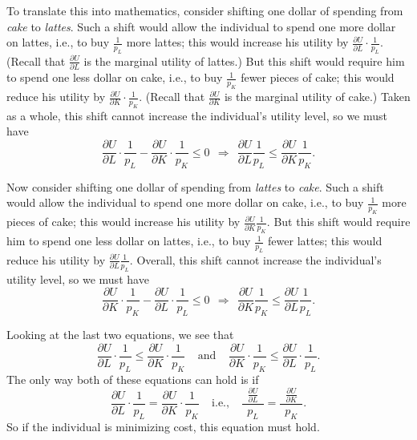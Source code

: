To translate this into mathematics, consider shifting one dollar of spending from \emph{cake} to \emph{lattes}. Such a shift would allow the individual to spend one more dollar on lattes, i.e., to buy $\displaystyle\frac{1}{p_L}$ more lattes; this would increase his utility by $\displaystyle\frac{\partial U}{\partial L}\cdot\frac{1}{p_L}$. (Recall that $\frac{\partial U}{\partial L}$ is the marginal utility of lattes.) But this shift would require him to spend one less dollar on cake, i.e., to buy $\displaystyle\frac{1}{p_K}$ fewer pieces of cake; this would reduce his utility by $\displaystyle \frac{\partial U}{\partial K}\cdot\frac{1}{p_K}$. (Recall that $\frac{\partial U}{\partial K}$ is the marginal utility of cake.) Taken as a whole, this shift cannot increase the individual's utility level, so we must have
\[
\frac{\partial U}{\partial L}\cdot\frac{1}{p_L} - \frac{\partial
U}{\partial K}\cdot\frac{1}{p_K} \leq 0 \ \ \Longrightarrow \ \
\frac{\partial U}{\partial L}\frac{1}{p_L} \leq \frac{\partial
U}{\partial K}\frac{1}{p_K}.
\]

Now consider shifting one dollar of spending from \emph{lattes} to \emph{cake}. Such a shift would allow the individual to spend one more dollar on cake, i.e., to buy $\displaystyle\frac{1}{p_K}$ more pieces of cake; this would increase his utility by $\displaystyle\frac{\partial U}{\partial K}\frac{1}{p_K}$. But this shift would require him to spend one less dollar on lattes, i.e., to buy $\displaystyle\frac{1}{p_L}$ fewer lattes; this would reduce his utility by $\displaystyle \frac{\partial U}{\partial L}\frac{1}{p_L}$. Overall, this shift cannot increase the individual's utility level, so we must have
\[
\frac{\partial U}{\partial K}\cdot\frac{1}{p_K} - \frac{\partial
U}{\partial L}\cdot\frac{1}{p_L} \leq 0 \ \ \Longrightarrow \ \
\frac{\partial U}{\partial K}\frac{1}{p_K} \leq \frac{\partial
U}{\partial L}\frac{1}{p_L}.
\]

Looking at the last two equations, we see that
\[
\frac{\partial U}{\partial L}\cdot\frac{1}{p_L} \leq
\frac{\partial U}{\partial K}\cdot\frac{1}{p_K} \ \ \ \ \
\mbox{and}\ \ \ \ \ \frac{\partial U}{\partial
K}\cdot\frac{1}{p_K} \leq \frac{\partial U}{\partial
L}\cdot\frac{1}{p_L}.
\]
The only way both of these equations can hold is if
\[
\frac{\partial U}{\partial L}\cdot\frac{1}{p_L} = \frac{\partial
U}{\partial K}\cdot\frac{1}{p_K} \ \ \ \ \ \mbox{i.e.,}\ \ \ \ \
\frac{\ \ \frac{\partial U}{\partial L}\ \ }{p_L}=\frac{\ \
\frac{\partial U}{\partial K}\ \ }{p_K}.
\]
So if the individual is minimizing cost, this equation must hold.


